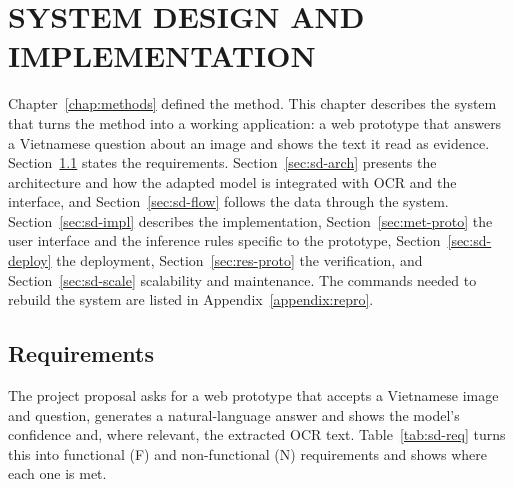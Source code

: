 
\chapter{SYSTEM DESIGN AND IMPLEMENTATION}
\label{chap:system}

\ifpdf
    \graphicspath{{Chapter5/Figs/Raster/}{Chapter5/Figs/PDF/}{Chapter5/Figs/}}
\else
    \graphicspath{{Chapter5/Figs/Vector/}{Chapter5/Figs/}}
\fi

Chapter~\ref{chap:methods} defined the method. This chapter describes the system that turns
the method into a working application: a web prototype that answers a Vietnamese question
about an image and shows the text it read as evidence. Section~\ref{sec:sd-req} states the
requirements. Section~\ref{sec:sd-arch} presents the architecture and how the adapted model
is integrated with OCR and the interface, and Section~\ref{sec:sd-flow} follows the data
through the system. Section~\ref{sec:sd-impl} describes the implementation,
Section~\ref{sec:met-proto} the user interface and the inference rules specific to the
prototype, Section~\ref{sec:sd-deploy} the deployment, Section~\ref{sec:res-proto} the
verification, and Section~\ref{sec:sd-scale} scalability and maintenance. The commands needed
to rebuild the system are listed in Appendix~\ref{appendix:repro}.

\section{Requirements}
\label{sec:sd-req}

The project proposal asks for a web prototype that accepts a Vietnamese image and question,
generates a natural-language answer and shows the model's confidence and, where relevant,
the extracted OCR text. Table~\ref{tab:sd-req} turns this into functional (F) and
non-functional (N) requirements and shows where each one is met.

